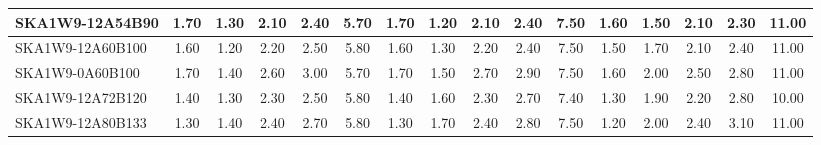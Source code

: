 \begin{table}[H]
{{\begin{tabular}{|lccccc||ccccc||ccccc|}
SKA1W9-12A54B90 & 1.70 \cellcolor{blue!60.00} & 1.30 \cellcolor{red!23.25} & 2.10 \cellcolor{green!18.00} & 2.40 \cellcolor{orange!18.00} & 5.70 \cellcolor{purple!51.60} & 1.70 \cellcolor{blue!60.00} & 1.20 \cellcolor{red!18.00} & 2.10 \cellcolor{green!18.00} & 2.40 \cellcolor{orange!18.00} & 7.50 \cellcolor{purple!60.00} & 1.60 \cellcolor{blue!51.60} & 1.50 \cellcolor{red!18.00} & 2.10 \cellcolor{green!18.00} & 2.30 \cellcolor{orange!18.00} & 11.00 \cellcolor{purple!60.00}\\ \hline 
SKA1W9-12A60B100 & 1.60 \cellcolor{blue!49.50} & 1.20 \cellcolor{red!18.00} & 2.20 \cellcolor{green!26.40} & 2.50 \cellcolor{orange!25.00} & 5.80 \cellcolor{purple!60.00} & 1.60 \cellcolor{blue!49.50} & 1.30 \cellcolor{red!22.67} & 2.20 \cellcolor{green!25.00} & 2.40 \cellcolor{orange!18.00} & 7.50 \cellcolor{purple!60.00} & 1.50 \cellcolor{blue!43.20} & 1.70 \cellcolor{red!32.00} & 2.10 \cellcolor{green!18.00} & 2.40 \cellcolor{orange!23.25} & 11.00 \cellcolor{purple!60.00}\\ \hline 
SKA1W9-0A60B100 & 1.70 \cellcolor{blue!60.00} & 1.40 \cellcolor{red!28.50} & 2.60 \cellcolor{green!60.00} & 3.00 \cellcolor{orange!60.00} & 5.70 \cellcolor{purple!51.60} & 1.70 \cellcolor{blue!60.00} & 1.50 \cellcolor{red!32.00} & 2.70 \cellcolor{green!60.00} & 2.90 \cellcolor{orange!60.00} & 7.50 \cellcolor{purple!60.00} & 1.60 \cellcolor{blue!51.60} & 2.00 \cellcolor{red!53.00} & 2.50 \cellcolor{green!60.00} & 2.80 \cellcolor{orange!44.25} & 11.00 \cellcolor{purple!60.00}\\ \hline 
SKA1W9-12A72B120 & 1.40 \cellcolor{blue!28.50} & 1.30 \cellcolor{red!23.25} & 2.30 \cellcolor{green!34.80} & 2.50 \cellcolor{orange!25.00} & 5.80 \cellcolor{purple!60.00} & 1.40 \cellcolor{blue!28.50} & 1.60 \cellcolor{red!36.67} & 2.30 \cellcolor{green!32.00} & 2.70 \cellcolor{orange!43.20} & 7.40 \cellcolor{purple!49.50} & 1.30 \cellcolor{blue!26.40} & 1.90 \cellcolor{red!46.00} & 2.20 \cellcolor{green!28.50} & 2.80 \cellcolor{orange!44.25} & 10.00 \cellcolor{purple!18.00}\\ \hline 
SKA1W9-12A80B133 & 1.30 \cellcolor{blue!18.00} & 1.40 \cellcolor{red!28.50} & 2.40 \cellcolor{green!43.20} & 2.70 \cellcolor{orange!39.00} & 5.80 \cellcolor{purple!60.00} & 1.30 \cellcolor{blue!18.00} & 1.70 \cellcolor{red!41.33} & 2.40 \cellcolor{green!39.00} & 2.80 \cellcolor{orange!51.60} & 7.50 \cellcolor{purple!60.00} & 1.20 \cellcolor{blue!18.00} & 2.00 \cellcolor{red!53.00} & 2.40 \cellcolor{green!49.50} & 3.10 \cellcolor{orange!60.00} & 11.00 \cellcolor{purple!60.00}\\ \hline 

\end{tabular}}}
\end{table}
